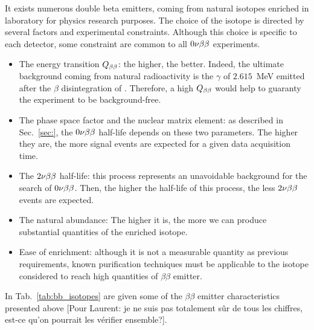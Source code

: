 It exists numerous double beta emitters, coming from natural isotopes enriched in laboratory for physics research purposes.
The choice of the isotope is directed by several factors and experimental constraints.
Although this choice is specific to each detector, some constraint are common to all $0\nu\beta\beta$ experiments.
\begin{itemize}
\item The energy transition $Q_{\beta\beta}$: the higher, the better.
Indeed, the ultimate background coming from natural radioactivity is the $\gamma$ of $2.615$~MeV emitted after the $\beta$ disintegration of \Tl.
Therefore, a high $Q_{\beta\beta}$ would help to guaranty the experiment to be background-free.
\item The phase space factor and the nuclear matrix element: as described in Sec.~\ref{sec:}, the $0\nu\beta\beta$ half-life depends on these two parameters.
The higher they are, the more signal events are expected for a given data acquisition time.
\item The $2\nu\beta\beta$ half-life: this process represents an unavoidable background for the search of $0\nu\beta\beta$.
Then, the higher the half-life of this process, the less $2\nu\beta\beta$ events are expected.
\item The natural abundance: The higher it is, the more we can produce substantial quantities of the enriched isotope.
\item Ease of enrichment: although it is not a measurable quantity as previous requirements, known purification techniques must be applicable to the isotope considered to reach high quantities of $\beta\beta$ emitter.
\end{itemize}
In Tab.~\ref{tab:bb_isotopes} are given some of the $\beta\beta$ emitter characteristics presented above [Pour Laurent: je ne suis pas totalement sûr de tous les chiffres, est-ce qu'on pourrait les vérifier ensemble?].
